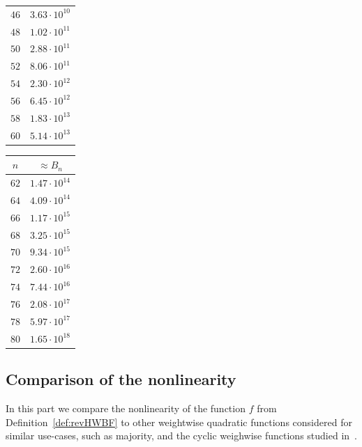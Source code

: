 \documentclass[11pt]{llncs}
\begin{document}
\begin{table}
\begin{minipage}{0.24\textwidth}
\begin{tabular}{|c|c|}
			$46$ & $3.63 \cdot 10^{10}$ \\
			$48$ & $1.02 \cdot 10^{11}$ \\
			$50$ & $2.88 \cdot 10^{11}$ \\
			$52$ & $8.06 \cdot 10^{11}$ \\
			$54$ & $2.30 \cdot 10^{12}$ \\
			$56$ & $6.45 \cdot 10^{12}$ \\
			$58$ & $1.83 \cdot 10^{13}$ \\
			$60$ & $5.14 \cdot 10^{13}$ \\
			\hline
		\end{tabular}
	\end{minipage}%
	\begin{minipage}{0.24\textwidth}
		\centering
		\begin{tabular}{|c|c|}
			\hline
			$n$ & $\approx B_n$ \\
			\hline
			$62$ & $1.47 \cdot 10^{14}$ \\
			$64$ & $4.09 \cdot 10^{14}$ \\
			$66$ & $1.17 \cdot 10^{15}$ \\
			$68$ & $3.25 \cdot 10^{15}$ \\
			$70$ & $9.34 \cdot 10^{15}$ \\
			$72$ & $2.60 \cdot 10^{16}$ \\
			$74$ & $7.44 \cdot 10^{16}$ \\
			$76$ & $2.08 \cdot 10^{17}$ \\
			$78$ & $5.97 \cdot 10^{17}$ \\
			$80$ & $1.65 \cdot 10^{18}$ \\
			\hline
		\end{tabular}
	\end{minipage}
	\label{table:walsh_bounds}
\end{table}



\subsection{Comparison of the nonlinearity}


In this part we compare the nonlinearity of the function $f$ from Definition~\ref{def:revHWBF} to other weightwise quadratic functions considered for similar use-cases, such as majority, \hwbf{} and the cyclic weighwise functions studied in~\cite{DAM:MeaOza24}. 
\end{document}
